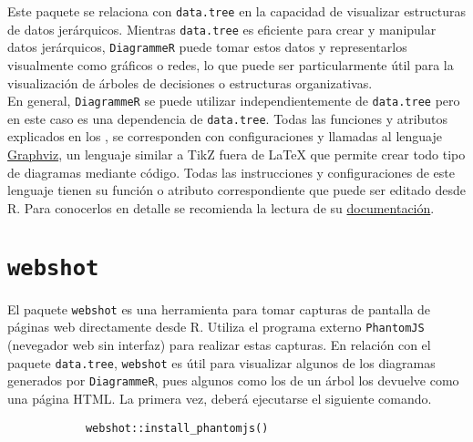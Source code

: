 \documentclass[12pt]{report}\usepackage[]{graphicx}\usepackage[dvipsnames]{xcolor}
\begin{document}
		 	Este paquete se relaciona con \texttt{data.tree} en la capacidad de visualizar estructuras de datos jerárquicos. Mientras \texttt{data.tree} es eficiente para crear y manipular datos jerárquicos, \texttt{DiagrammeR} puede tomar estos datos y representarlos visualmente como gráficos o redes, lo que puede ser particularmente útil para la visualización de árboles de decisiones o estructuras organizativas.\\
		 	
		 	En general, \texttt{DiagrammeR} se puede utilizar independientemente de \texttt{data.tree} pero en este caso es una dependencia de \texttt{data.tree}. Todas las funciones y atributos explicados en los , se corresponden con configuraciones y llamadas al lenguaje \href{https://graphviz.org/}{Graphviz}, un lenguaje similar a TikZ fuera de \LaTeX{} que permite crear todo tipo de diagramas mediante código. Todas las instrucciones y configuraciones de este lenguaje tienen su función o atributo correspondiente que puede ser editado desde R. Para conocerlos en detalle se recomienda la lectura de su \href{https://graphviz.org/documentation/}{documentación}. 
		 	
	 \section{\texttt{webshot}}
	 
	 	El paquete \texttt{webshot} es una herramienta para tomar capturas de pantalla de páginas web directamente desde R. Utiliza el programa externo \texttt{PhantomJS} (nevegador web sin interfaz) para realizar estas capturas. En relación con el paquete \texttt{data.tree}, \texttt{webshot} es útil para visualizar algunos de los diagramas generados por \texttt{DiagrammeR}, pues algunos como los de un árbol los devuelve como una página HTML. La primera vez, deberá ejecutarse el siguiente comando. 
	 	
	 	\begin{verbatim}
	 		webshot::install_phantomjs()
	 	\end{verbatim}
	 		
\end{document}
